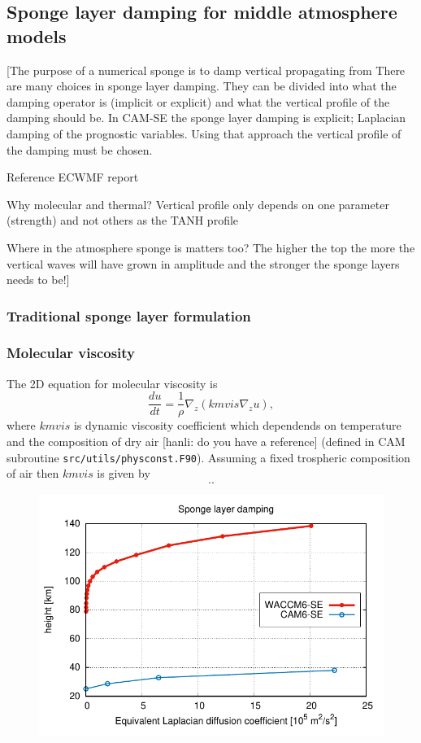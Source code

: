 \documentclass[draft]{agujournal2019}
\begin{document}
\subsection{Sponge layer damping for middle atmosphere models}
[The purpose of a numerical sponge is to damp vertical propagating from There are many choices in sponge layer damping. They can be divided into what the damping operator is (implicit or explicit) and what the vertical profile of the damping should be. In CAM-SE the sponge layer damping is explicit; Laplacian damping of the prognostic variables. Using that approach the vertical profile of the damping must be chosen. 

Reference ECWMF report

Why molecular and thermal? Vertical profile only depends on one parameter (strength) and not others as the TANH profile

Where in the atmosphere sponge is matters too? The higher the top the more the vertical waves will have grown in amplitude and the stronger the sponge layers needs to be!]

\subsubsection{Traditional sponge layer formulation}
\subsubsection{Molecular viscosity}
The 2D equation for molecular viscosity is
\begin{equation}
    \frac{du}{dt}=\frac{1}{\rho}\nabla_z \left( kmvis \nabla_z u\right),
\end{equation}
where $kmvis$ is dynamic viscosity coefficient which dependends on temperature and the composition of dry air [hanli: do you have a reference] (defined in CAM subroutine \verb+src/utils/physconst.F90+). Assuming a fixed trospheric composition of air then $kmvis$ is given by
\begin{equation}
..
\end{equation}
\begin{figure}
\noindent\includegraphics[width=\textwidth]{figs/sponge.pdf}
\caption{}
\end{figure}
\end{document}
